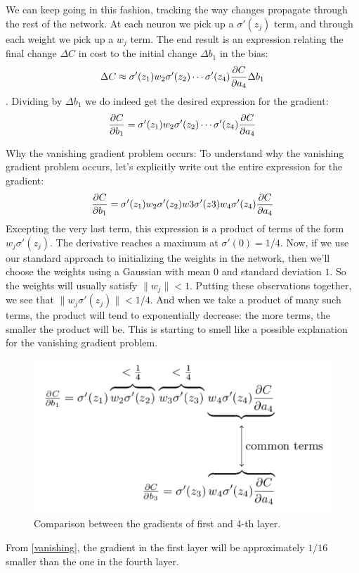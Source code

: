 We can keep going in this fashion, tracking the way changes propagate through the rest of the network. At each neuron we pick up a $\sigma'(z_j)$ term, and through each weight we pick up a $w_j$ term. The end result is an expression relating the final change $\Delta C$
 in cost to the initial change $\Delta b_1$ in the bias:
\begin{equation}
\Delta C\approx\sigma'(z_1)w_2\sigma'(z_2)\cdots\sigma'(z_4)\frac{\mathrm{\partial} C}{\mathrm{\partial} a_4}\Delta b_1
\end{equation}. 
Dividing by $\Delta b_1$ we do indeed get the desired expression for the gradient:
\begin{equation}
\frac{\mathrm{\partial} C}{\mathrm{\partial} b_1}=\sigma'(z_1)w_2\sigma'(z_2)\cdots\sigma'(z_4)\frac{\mathrm{\partial} C}{\mathrm{\partial} a_4}
\end{equation}

Why the vanishing gradient problem occurs: To understand why the vanishing gradient problem occurs, let's explicitly write out the entire expression for the gradient:
\begin{equation}
\frac{\mathrm{\partial} C}{\mathrm{\partial} b_1}=\sigma'(z_1)w_2\sigma'(z_2)w3\sigma'(z3)w_4\sigma'(z_4)\frac{\mathrm{\partial} C}{\mathrm{\partial} a_4}
\end{equation} 
Excepting the very last term, this expression is a product of terms of the form $w_j\sigma'(z_j)$. The derivative reaches a maximum at $\sigma'(0)=1/4$.  Now, if we use our standard approach to initializing the weights in the network, then we'll choose the weights using a Gaussian with mean $0$ and standard deviation $1$. So the weights will usually satisfy $\|w_j\|<1$. Putting these observations together, we see that $\|w_j \sigma'(z_j)\|<1/4$. And when we take a product of many such terms, the product will tend to exponentially decrease: the more terms, the smaller the product will be. This is starting to smell like a possible explanation for the vanishing gradient problem.
\begin{figure}
\centering
\includegraphics[scale=0.5]{img/vanishinggradient}
\caption{Comparison between the gradients of first and 4-th layer.}
\label{vanishing}
\end{figure}
From \autoref{vanishing}, the gradient in the first layer will be approximately $1/16$ smaller than the one in the fourth layer.

